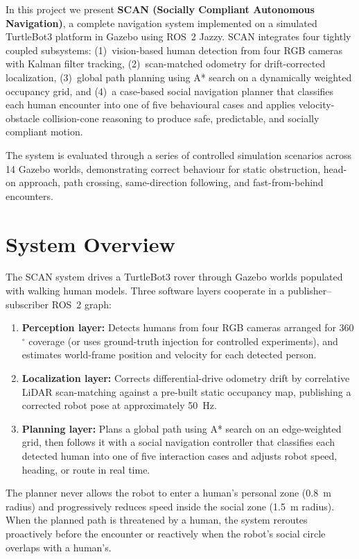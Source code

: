 \documentclass[a4paper]{article}
\begin{document}
In this project we present \textbf{SCAN (Socially Compliant Autonomous Navigation)}, a complete navigation system implemented on a simulated TurtleBot3 platform in Gazebo using ROS~2 Jazzy. SCAN integrates four tightly coupled subsystems: (1)~vision-based human detection from four RGB cameras with Kalman filter tracking, (2)~scan-matched odometry for drift-corrected localization, (3)~global path planning using A* search on a dynamically weighted occupancy grid, and (4)~a case-based social navigation planner that classifies each human encounter into one of five behavioural cases and applies velocity-obstacle collision-cone reasoning to produce safe, predictable, and socially compliant motion.

The system is evaluated through a series of controlled simulation scenarios across 14 Gazebo worlds, demonstrating correct behaviour for static obstruction, head-on approach, path crossing, same-direction following, and fast-from-behind encounters.


\section{System Overview}

The SCAN system drives a TurtleBot3 rover through Gazebo worlds populated with walking human models. Three software layers cooperate in a publisher--subscriber ROS~2 graph:

\begin{enumerate}
    \item \textbf{Perception layer:} Detects humans from four RGB cameras arranged for 360$^\circ$ coverage (or uses ground-truth injection for controlled experiments), and estimates world-frame position and velocity for each detected person.
    \item \textbf{Localization layer:} Corrects differential-drive odometry drift by correlative LiDAR scan-matching against a pre-built static occupancy map, publishing a corrected robot pose at approximately 50~Hz.
    \item \textbf{Planning layer:} Plans a global path using A* search on an edge-weighted grid, then follows it with a social navigation controller that classifies each detected human into one of five interaction cases and adjusts robot speed, heading, or route in real time.
\end{enumerate}

The planner never allows the robot to enter a human's personal zone (0.8~m radius) and progressively reduces speed inside the social zone (1.5~m radius). When the planned path is threatened by a human, the system reroutes proactively before the encounter or reactively when the robot's social circle overlaps with a human's.
\end{document}
